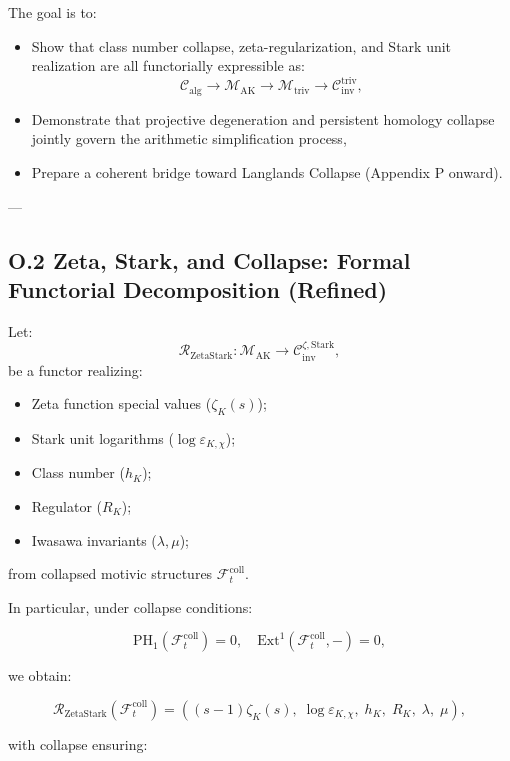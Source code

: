 \documentclass[11pt]{article}
\begin{document}
The goal is to:
\begin{itemize}
  \item Show that class number collapse, zeta-regularization, and Stark unit realization are all functorially expressible as:
  \[
  \mathcal{C}_{\mathrm{alg}} \longrightarrow \mathcal{M}_{\mathrm{AK}} \longrightarrow \mathcal{M}_{\mathrm{triv}} \longrightarrow \mathcal{C}_{\mathrm{inv}}^{\mathrm{triv}},
  \]
  \item Demonstrate that projective degeneration and persistent homology collapse jointly govern the arithmetic simplification process,
  \item Prepare a coherent bridge toward Langlands Collapse (Appendix P onward).
\end{itemize}

---

\subsection*{O.2 Zeta, Stark, and Collapse: Formal Functorial Decomposition (Refined)}

Let:
\[
\mathcal{R}_{\mathrm{ZetaStark}} : \mathcal{M}_{\mathrm{AK}} \longrightarrow \mathcal{C}_{\mathrm{inv}}^{\zeta, \mathrm{Stark}},
\]
be a functor realizing:

\begin{itemize}
  \item Zeta function special values (\( \zeta_K(s) \));
  \item Stark unit logarithms (\( \log \varepsilon_{K,\chi} \));
  \item Class number (\( h_K \));
  \item Regulator (\( R_K \));
  \item Iwasawa invariants (\( \lambda, \mu \));
\end{itemize}

from collapsed motivic structures \( \mathcal{F}_t^{\mathrm{coll}} \).

In particular, under collapse conditions:

\[
\mathrm{PH}_1(\mathcal{F}_t^{\mathrm{coll}}) = 0, \quad \mathrm{Ext}^1(\mathcal{F}_t^{\mathrm{coll}}, -) = 0,
\]

we obtain:

\[
\mathcal{R}_{\mathrm{ZetaStark}}(\mathcal{F}_t^{\mathrm{coll}}) =
\left( (s - 1)\zeta_K(s),\; \log \varepsilon_{K,\chi},\; h_K,\; R_K,\; \lambda,\; \mu \right),
\]

with collapse ensuring:
\end{document}
